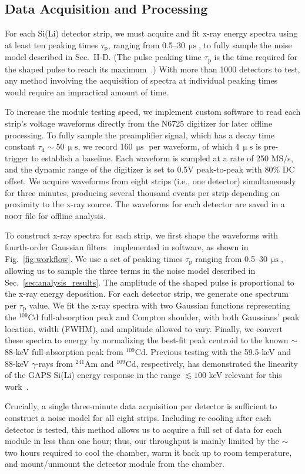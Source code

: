 \documentclass[journal]{IEEEtran}
\newcommand{\red}[1]{\textcolor{black}{#1}}
\begin{document}
\subsection{Data Acquisition and Processing}
For each Si(Li) detector strip, we must acquire and fit x-ray energy spectra using at least ten peaking times $\tau_\text{p}$, ranging from 0.5--30$\,\upmu\text{s}$, to fully sample the noise model described in Sec.~II-D. (The pulse peaking time $\tau_\text{p}$ is the time required for the shaped pulse to reach its maximum~\cite{Grupen:2008zz}.) With more than 1000 detectors to test, any method involving the acquisition of spectra at individual peaking times would require an impractical amount of time.    
%
\par To increase the module testing speed, we implement custom software to read each strip's voltage waveforms directly from the N6725 digitizer for later offline processing. To fully sample the preamplifier signal, which has a decay time constant $\tau_\text{d} \sim 50\,\upmu\text{s}$, we record 160\,$\upmu\text{s}$ per waveform, of which $4\,\upmu\text{s}$ is pre-trigger to establish a baseline. Each waveform is sampled at a rate of 250 MS/s, and the dynamic range of the digitizer is set to 0.5V peak-to-peak with 80\% DC offset. We acquire waveforms from eight strips (i.e., one detector) simultaneously for three minutes, producing several thousand events per strip depending on proximity to the x-ray source. The waveforms for each detector are saved in a \textsc{root} file for offline analysis.
%
\par To construct x-ray spectra for each strip, we first shape the waveforms with fourth-order Gaussian filters~\cite{Ohkawa:1976} implemented in software, \red{as shown in Fig.~\ref{fig:workflow}}. We use a set of peaking times $\tau_\text{p}$ ranging from  0.5--30$\,\upmu\text{s}$, allowing us to sample the three terms in the noise model described in Sec.~\ref{sec:analysis_results}. The amplitude of the shaped pulse is proportional to the x-ray energy deposition. For each detector strip, we generate one spectrum per $\tau_\text{p}$ value. We fit the x-ray spectra with two Gaussian functions representing the $^{109}\text{Cd}$ full-absorption peak and Compton shoulder, with both Gaussians' peak location, width (FWHM), and amplitude allowed to vary. Finally, we convert these spectra to energy by normalizing the best-fit peak centroid to the known ${\sim}$88-keV full-absorption peak from $^{109}\text{Cd}$. Previous testing with the 59.5-keV and 88-keV $\gamma$-rays from $^{241}\text{Am}$ and $^{109}\text{Cd}$, respectively, has demonstrated the linearity of the GAPS Si(Li) energy response in the range ${\lesssim}100$ keV relevant for this work~\cite{Rogers:2019avj}.
%
\par Crucially, a single three-minute data acquisition per detector is sufficient to construct a noise model for all eight strips. Including re-cooling after each detector is tested, this method allows us to acquire a full set of data for each module in less than one hour; thus, our throughput is mainly limited by the ${\sim}$two hours required to cool the chamber, warm it back up to room temperature, and mount/unmount the detector module from the chamber.
\end{document}
